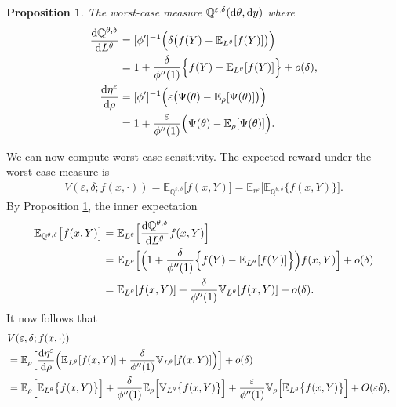 \documentclass[11pt,reqno,letter]{amsart}
\theoremstyle{plain}
\newtheorem{proposition}[theorem]{Proposition}
\theoremstyle{definition}
\numberwithin{equation}{section}
\numberwithin{theorem}{section}
\numberwithin{table}{section}
\numberwithin{figure}{section}
\begin{document}
\begin{proposition} \label{prop:wc-bayes}
The worst-case measure ${\mathbb Q}^{\varepsilon, \delta}({\rm d}\theta, {\rm d}y)$
where
\begin{align*}
\frac{{\rm d}{\mathbb Q}^{\theta, \delta}}{{\rm d}L^{\theta}}  
& = [\phi']^{-1}\Big(\delta\big( f(Y)  -{\mathbb E}_{L^{\theta}}[f(Y)]\big)\Big) \\ 
& = 1 + \frac{\delta}{\phi{''}(1)}\Big\{f(Y)-{\mathbb E}_{L^\theta}[f(Y)]\Big\} + o(\delta),\\
\frac{{\rm d}\eta^\varepsilon}{{\rm d}\rho}
& = [\phi']^{-1}\Big(\varepsilon\big( \Psi(\theta)  -{\mathbb E}_{\rho}[\Psi(\theta)]\big)\Big) \\
& = 1+ \frac{\varepsilon}{\phi''(1)}\Big(\Psi(\theta)-{\mathbb E}_\rho[\Psi(\theta)]\Big).
\end{align*}
\end{proposition} 
We can now compute worst-case sensitivity. The expected reward under the worst-case measure is
\begin{align*}
V(\varepsilon, \delta; f(x,\cdot))  = {\mathbb E}_{{\mathbb Q}^{\varepsilon, \delta}}\big[f(x, Y)\big] 
  = {\mathbb E}_{\eta^{\varepsilon}} \Big[{\mathbb E}_{{\mathbb Q}^{\theta,\delta}} \big\{f(x, Y)\big\}\Big].
\end{align*}
By Proposition \ref{prop:wc-bayes}, the inner expectation
\begin{align*}
{\mathbb E}_{{\mathbb Q}^{\theta,\delta}} \big[f(x, Y)\big] & = {\mathbb E}_{L^\theta}\Big[\frac{{\rm d}{\mathbb Q}^{\theta, \delta}}{{\rm d}L^{\theta}} f(x, Y)\Big] \\
& = {\mathbb E}_{L^\theta}\Big[\Big(1 + \frac{\delta}{\phi{''}(1)}\Big\{f(Y)-{\mathbb E}_{L^\theta}[f(Y)]\Big\} \Big)f(x, Y)\Big]+o(\delta) \\
& = {\mathbb E}_{L^\theta}[f(x, Y)] + \frac{\delta}{\phi{''}(1)} {\mathbb V}_{L^{\theta}}[f(x, Y)] + o(\delta).
\end{align*}
It now follows that 
\begin{align*}
\lefteqn{V(\varepsilon, \delta; f(x, \cdot))}\\ 
& = {\mathbb E}_\rho\Big[\frac{{\rm d}\eta^{\varepsilon}}{{\rm d}\rho}\Big({\mathbb E}_{L^\theta}[f(x, Y)] + \frac{\delta}{\phi{''}(1)} {\mathbb V}_{L^{\theta}}[f(x, Y)] \Big)\Big] + o(\delta) \\
& = {\mathbb E}_\rho \Big[{\mathbb E}_{L^\theta}\big\{f(x, Y)\big\}\Big]+ \frac{\delta}{\phi{''}(1)}  {\mathbb E}_{\rho} \Big[{\mathbb V}_{L^\theta}\big\{f(x, Y)\big\}\Big] + \frac{\varepsilon}{\phi{''}(1)} {\mathbb V}_{\rho} \Big[{\mathbb E}_{L^\theta}\big\{f(x, Y)\big\}\Big]  + O(\varepsilon \delta),
\end{align*}
\end{document}
